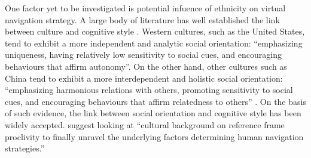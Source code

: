 \documentclass{frontiersSCNS} %
\begin{document}
One factor yet to be investigated is potential infuence of ethnicity on virtual navigation strategy. A large body of literature has well established the link between culture and cognitive style \citep{kitayama2010,kitayama2009,norenzayan2007,varnum2008}. Western cultures, such as the United States, tend to exhibit a more independent and analytic social orientation: “emphasizing uniqueness, having relatively low sensitivity to social cues, and encouraging behaviours that affirm autonomy”. On the other hand, other cultures such as China tend to exhibit a more interdependent and holistic social orientation: “emphasizing harmonious relations with others, promoting sensitivity to social cues, and encouraging behaviours that affirm relatedness to others” \citep{kitayama2010,varnum2010}. On the basis of such evidence, the link between social orientation and cognitive style has been widely accepted. \citep{Goeke2013} suggest looking at “cultural background on reference frame proclivity to finally unravel the underlying factors determining human navigation strategies.”
\end{document}
